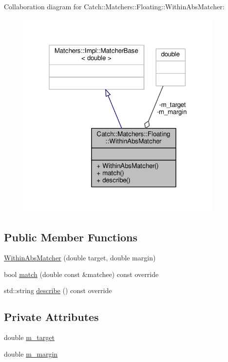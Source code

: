 Collaboration diagram for Catch\-:\-:Matchers\-:\-:Floating\-:\-:Within\-Abs\-Matcher\-:
\nopagebreak
\begin{figure}[H]
\begin{center}
\leavevmode
\includegraphics[width=292pt]{struct_catch_1_1_matchers_1_1_floating_1_1_within_abs_matcher__coll__graph}
\end{center}
\end{figure}
\subsection*{Public Member Functions}
\begin{DoxyCompactItemize}
\item 
\hyperlink{struct_catch_1_1_matchers_1_1_floating_1_1_within_abs_matcher_ac45340b98c41230a7def5bd86c2d870f}{Within\-Abs\-Matcher} (double target, double margin)
\item 
bool \hyperlink{struct_catch_1_1_matchers_1_1_floating_1_1_within_abs_matcher_afa5d8eed57f12c1e5d006471eb0bfe72}{match} (double const \&matchee) const override
\item 
std\-::string \hyperlink{struct_catch_1_1_matchers_1_1_floating_1_1_within_abs_matcher_a206a738680f8767af31d3f1835afff3f}{describe} () const override
\end{DoxyCompactItemize}
\subsection*{Private Attributes}
\begin{DoxyCompactItemize}
\item 
double \hyperlink{struct_catch_1_1_matchers_1_1_floating_1_1_within_abs_matcher_a8d9f249c0e2969cf0522dc81db6ff280}{m\-\_\-target}
\item 
double \hyperlink{struct_catch_1_1_matchers_1_1_floating_1_1_within_abs_matcher_a2270487cd55fa06044f5f6aaab724c5f}{m\-\_\-margin}
\end{DoxyCompactItemize}


